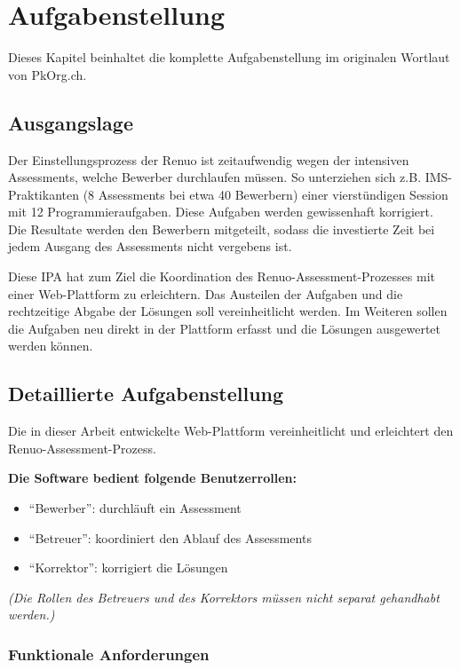 \chapter{Aufgabenstellung} \label{ch:task}

Dieses Kapitel beinhaltet die komplette Aufgabenstellung im originalen Wortlaut von PkOrg.ch.

\section{Ausgangslage}

Der Einstellungsprozess der Renuo ist zeitaufwendig wegen der intensiven Assessments, welche Bewerber
durchlaufen müssen. So unterziehen sich z.B. IMS-Praktikanten (8 Assessments bei etwa 40 Bewerbern) einer
vierstündigen Session mit 12 Programmieraufgaben. Diese Aufgaben werden gewissenhaft korrigiert. Die
Resultate werden den Bewerbern mitgeteilt, sodass die investierte Zeit bei jedem Ausgang des Assessments
nicht vergebens ist.

Diese IPA hat zum Ziel die Koordination des Renuo-Assessment-Prozesses mit einer Web-Plattform zu
erleichtern. Das Austeilen der Aufgaben und die rechtzeitige Abgabe der Lösungen soll vereinheitlicht werden.
Im Weiteren sollen die Aufgaben neu direkt in der Plattform erfasst und die Lösungen ausgewertet werden
können.

\section{Detaillierte Aufgabenstellung} \label{sec:task-detail}

Die in dieser Arbeit entwickelte Web-Plattform vereinheitlicht und erleichtert den Renuo-Assessment-Prozess.

\textbf{Die Software bedient folgende Benutzerrollen:}
\begin{itemize}
    \item \enquote{Bewerber}: durchläuft ein Assessment
    \item \enquote{Betreuer}: koordiniert den Ablauf des Assessments
    \item \enquote{Korrektor}: korrigiert die Lösungen
\end{itemize}

\emph{(Die Rollen des Betreuers und des Korrektors müssen nicht separat gehandhabt werden.)}

\newpage

\subsection{Funktionale Anforderungen}

